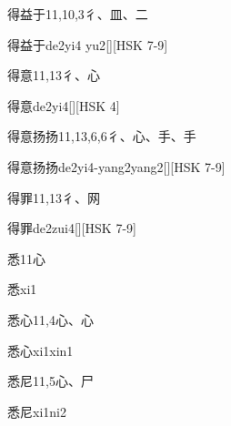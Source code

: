 \begin{Entry}{得益于}{11,10,3}{⼻、⽫、⼆}
  \begin{Phonetics}{得益于}{de2yi4 yu2}[][HSK 7-9]
  \end{Phonetics}
\end{Entry}

\begin{Entry}{得意}{11,13}{⼻、⼼}
  \begin{Phonetics}{得意}{de2yi4}[][HSK 4]
  \end{Phonetics}
\end{Entry}

\begin{Entry}{得意扬扬}{11,13,6,6}{⼻、⼼、⼿、⼿}
  \begin{Phonetics}{得意扬扬}{de2yi4-yang2yang2}[][HSK 7-9]
  \end{Phonetics}
\end{Entry}

\begin{Entry}{得罪}{11,13}{⼻、⽹}
  \begin{Phonetics}{得罪}{de2zui4}[][HSK 7-9]
  \end{Phonetics}
\end{Entry}

\begin{Entry}{悉}{11}{⼼}
  \begin{Phonetics}{悉}{xi1}
  \end{Phonetics}
\end{Entry}

\begin{Entry}{悉心}{11,4}{⼼、⼼}
  \begin{Phonetics}{悉心}{xi1xin1}
  \end{Phonetics}
\end{Entry}

\begin{Entry}{悉尼}{11,5}{⼼、⼫}
  \begin{Phonetics}{悉尼}{xi1ni2}
  \end{Phonetics}
\end{Entry}

